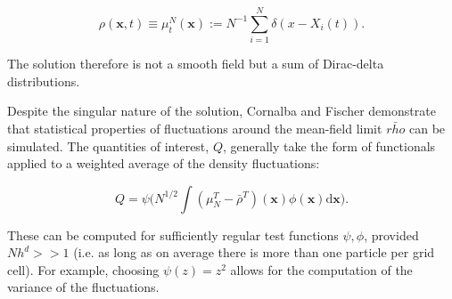 \begin{equation*}
    \rho(\mathbf{x},t) \equiv \mu_t^N(\mathbf{x}) := N^{-1} \sum_{i=1}^N\delta(x - X_i(t)).
\end{equation*}

The solution therefore is not a smooth field but a sum 
of Dirac-delta distributions. 

Despite the singular nature of the solution, 
Cornalba and Fischer \cite{cornalba2025multilevel} demonstrate that
statistical properties of fluctuations 
around the mean-field limit $\bar{rho}$ can be simulated. 
The quantities of interest, $Q$, generally take the form of functionals applied 
to a weighted average of the density fluctuations:

\begin{equation} 
    Q = \psi\big(N^{1/2} \int (\mu_N^T - \bar{\rho}^T)(\mathbf{x})
    \phi(\mathbf{x})\mathrm{d}\mathbf{x}\big).
\end{equation}

These can be computed
for sufficiently regular test functions $\psi, \phi$, provided $Nh^d >> 1$
(i.e. as long as on average there is more than one particle per grid cell). 
For example, choosing $\psi(z) = z^2$ allows for the computation of the 
variance of the fluctuations.




